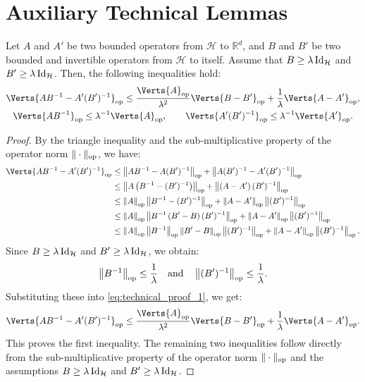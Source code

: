 \section{Auxiliary Technical Lemmas}\label{ab_sec:aux}
\begin{lemma}\label{lem:tech_res_1}
Let $A$ and $A'$ be two bounded operators from $\mathcal{H}$ to $\mathbb{R}^d$, and $B$ and $B'$ be two bounded and invertible operators from $\mathcal{H}$ to itself. Assume that $B\geq \lambda\operatorname{Id}_{\mathcal{H}}$ and $B'\geq \lambda\operatorname{Id}_{\mathcal{H}}$. 
Then, the following inequalities hold:
\begin{gather*}
    \Verts{AB^{-1}-A'(B')^{-1}}_{\op} \leq \frac{\Verts{A}_{\op}}{\lambda^2}\Verts{B-B'}_{\op} + \frac{1}{\lambda}\Verts{A-A'}_{\op},\\
    \Verts{AB^{-1}}_{\op}\leq \lambda^{-1}\Verts{A}_{\op}, \qquad\Verts{A'(B')^{-1}}_{\op}\leq \lambda^{-1}\Verts{A'}_{\op}.
\end{gather*}
\end{lemma}

\begin{proof}
By the triangle inequality and the sub-multiplicative property of the operator norm $\|\cdot\|_{\operatorname{op}}$, we have:
\begin{align}
    \Verts{AB^{-1}-A'(B')^{-1}}_{\op}&\leq\left\|AB^{-1} - A(B')^{-1}\right\|_{\op}+\left\|A(B')^{-1} - A'(B')^{-1}\right\|_{\op}\nonumber\\
    &\leq\left\|A\left(B^{-1} - (B')^{-1}\right)\right\|_{\op}+\left\|\left(A - A'\right)(B')^{-1}\right\|_{\op}\nonumber\\
    &\leq\left\|A\right\|_{\op}\left\|B^{-1} - (B')^{-1}\right\|_{\op}+\left\|A-A'\right\|_{\op}\left\|(B')^{-1}\right\|_{\op}\nonumber\\
    &\leq\left\|A\right\|_{\op}\left\|B^{-1}\left(B'-B\right) (B')^{-1}\right\|_{\op}+\left\|A-A'\right\|_{\op}\left\|(B')^{-1}\right\|_{\op}\nonumber\\
    &\leq\left\|A\right\|_{\op}\left\|B^{-1}\right\|_{\op}\left\|B'-B\right\|_{\op}\left\|(B')^{-1}\right\|_{\op}+\left\|A-A'\right\|_{\op}\left\|(B')^{-1}\right\|_{\op}.
    \label{eq:technical_proof_1}
\end{align}
Since $B\geq \lambda\operatorname{Id}_{\mathcal{H}}$ and $B'\geq \lambda\operatorname{Id}_{\mathcal{H}}$, we obtain:
\begin{equation*}
    \left\|B^{-1}\right\|_{\operatorname{op}}\leq\frac{1}{\lambda}\quad\text{and}\quad\left\|(B')^{-1}\right\|_{\operatorname{op}}\leq\frac{1}{\lambda}.
\end{equation*}
Substituting these into \cref{eq:technical_proof_1}, we get:
\begin{align*}
    \Verts{AB^{-1}-A'(B')^{-1}}_{\op}\leq\frac{\Verts{A}_{\op}}{\lambda^2}\Verts{B-B'}_{\op} + \frac{1}{\lambda}\Verts{A-A'}_{\op}.
\end{align*}
This proves the first inequality. The remaining two inequalities follow directly from the sub-multiplicative property of the operator norm $\|\cdot\|_{\operatorname{op}}$ and the assumptions $B\geq \lambda\operatorname{Id}_{\mathcal{H}}$ and $B'\geq \lambda\operatorname{Id}_{\mathcal{H}}$.
\end{proof}


